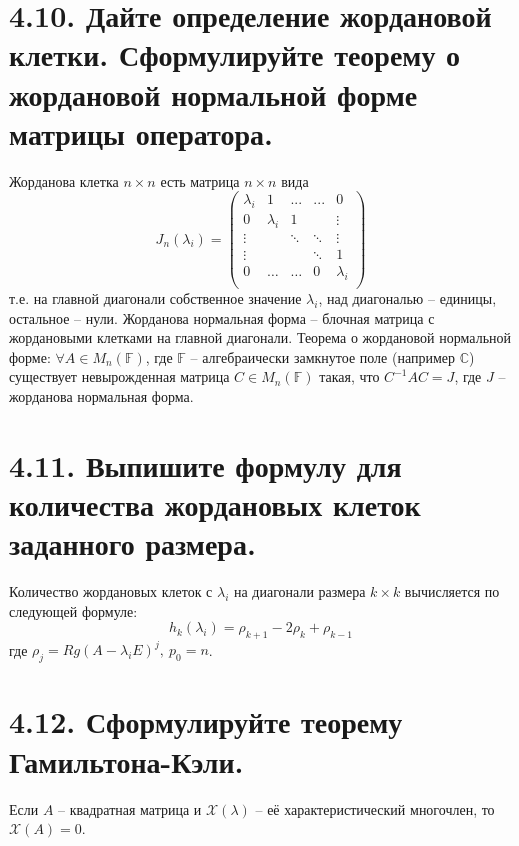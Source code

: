\documentclass{article}
\begin{document}
\section*{\LARGE 4.10. Дайте определение жордановой клетки. Сформулируйте теорему о жордановой нормальной форме матрицы оператора.}
Жорданова клетка $n\times n$ есть матрица $n\times n$ вида
$$
J_n(\lambda_i) = 
\begin{pmatrix}
\lambda_i & 1 & ... & ... & 0 \\
0 & \lambda_i& 1 &  & \vdots \\
\vdots &  & \ddots & \ddots & \vdots \\
\vdots &  &  & \ddots & 1 \\
0 & \dots & \dots & 0 & \lambda_i \\
\end{pmatrix}
$$
т.е. на главной диагонали собственное значение $\lambda_i$, над диагональю -- единицы, остальное -- нули.
\newline Жорданова нормальная форма -- блочная матрица с жордановыми клетками на главной диагонали.
\newline Теорема о жордановой нормальной форме: $\forall A \in M_n(\mathbb{F})$, где $\mathbb{F}$ -- алгебраически замкнутое поле (например $\mathbb{C}$) существует невырожденная матрица $C \in M_n(\mathbb{F})$ такая, что $C^{-1}AC = J$, где $J$ -- жорданова нормальная форма.

\section*{\LARGE 4.11. Выпишите формулу для количества жордановых клеток заданного размера.}
Количество жордановых клеток с $\lambda_i$ на диагонали размера $k \times k$ вычисляется по следующей формуле:
$$
h_k(\lambda_i) = \rho_{k + 1} - 2\rho_k + \rho_{k - 1}
$$
где $\rho_j = Rg(A - \lambda_i E)^j, \: p_0 = n$.

\section*{\LARGE 4.12. Сформулируйте теорему Гамильтона-Кэли.}
Если $A$ -- квадратная матрица и $\mathcal{X}(\lambda)$ -- её характеристический многочлен, то $\mathcal{X}(A) = 0$.
\end{document}
